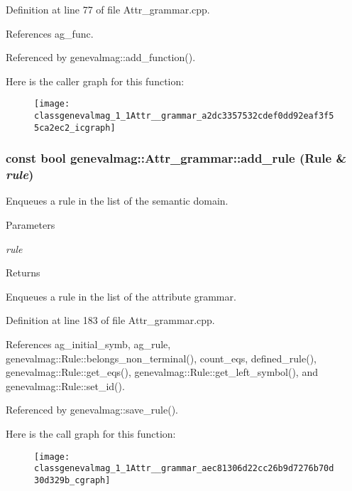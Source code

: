 Definition at line 77 of file Attr\_\-grammar.cpp.



References ag\_\-func.



Referenced by genevalmag::add\_\-function().



Here is the caller graph for this function:\nopagebreak
\begin{figure}[H]
\begin{center}
\leavevmode
\texttt{[image: classgenevalmag\_1\_1Attr\_\_grammar\_a2dc3357532cdef0dd92eaf3f55ca2ec2\_icgraph]}
\end{center}
\end{figure}


\hypertarget{classgenevalmag_1_1Attr__grammar_aec81306d22cc26b9d7276b70d30d329b}{
\subsubsection[{add\_\-rule}]{\setlength{\rightskip}{0pt plus 5cm}const bool genevalmag::Attr\_\-grammar::add\_\-rule ({\bf Rule} \& {\em rule})}}
\label{classgenevalmag_1_1Attr__grammar_aec81306d22cc26b9d7276b70d30d329b}
Enqueues a rule in the list of the semantic domain. 
\begin{DoxyParams}{Parameters}
\item[{\em rule}]\end{DoxyParams}
\begin{DoxyReturn}{Returns}

\end{DoxyReturn}
Enqueues a rule in the list of the attribute grammar. 

Definition at line 183 of file Attr\_\-grammar.cpp.



References ag\_\-initial\_\-symb, ag\_\-rule, genevalmag::Rule::belongs\_\-non\_\-terminal(), count\_\-eqs, defined\_\-rule(), genevalmag::Rule::get\_\-eqs(), genevalmag::Rule::get\_\-left\_\-symbol(), and genevalmag::Rule::set\_\-id().



Referenced by genevalmag::save\_\-rule().



Here is the call graph for this function:\nopagebreak
\begin{figure}[H]
\begin{center}
\leavevmode
\texttt{[image: classgenevalmag\_1\_1Attr\_\_grammar\_aec81306d22cc26b9d7276b70d30d329b\_cgraph]}
\end{center}
\end{figure}




